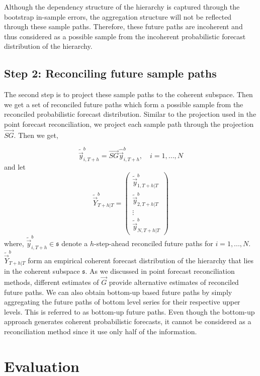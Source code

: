 \documentclass[graybox]{svmult}
\begin{document}
Although the dependency structure of the hierarchy is captured through the bootstrap in-sample errors, the aggregation structure will not be reflected through these sample paths. Therefore, these future paths are incoherent and thus considered as a possible sample from the incoherent probabilistic forecast distribution of the hierarchy.

\subsection*{Step 2: Reconciling future sample paths}

The second step is to project these sample paths to the coherent subspace. Then we get a set of reconciled future paths which form a possible sample from the reconciled probabilistic forecast distribution. Similar to the projection used in the point forecast reconciliation, we project each sample path through the projection $\vec{SG}$. Then we get,

\begin{equation} \label{eq:20}
\tilde{\vec{y}}_{i,T+h}^b = \vec{SG}\hat{\vec{y}}_{i,T+h}^b, \quad i = 1, ..., N
\end{equation}
and let
\begin{equation}\label{eq:21}
\tilde{\vec{Y}}^b_{T+h|T}=\begin{pmatrix}
\tilde{\vec{y}}_{1,T+h|T}^b\\
\tilde{\vec{y}}_{2,T+h|T}^b\\
\vdots\\
\tilde{\vec{y}}_{N,T+h|T}^b
\end{pmatrix}
\end{equation}
where, $\tilde{\vec{y}}_{i,T+h}^b \in \mathfrak{s}$ denote a $h$-step-ahead reconciled future paths for $i=1,...,N$. $\tilde{\vec{Y}}^b_{T+h|T}$ form an empirical coherent forecast distribution of the hierarchy that lies in the coherent subspace $\mathfrak{s}$. As we discussed in point forecast reconciliation methods, different estimates of $\vec{G}$ provide alternative estimates of reconciled future paths. We can also obtain bottom-up based future paths by simply aggregating the future paths of bottom level series for their respective upper levels. This is referred to as bottom-up future paths. Even though the bottom-up approach generates coherent probabilistic forecasts, it cannot be considered as a reconciliation method since it use only half of the information.


\section{Evaluation}
\end{document}
